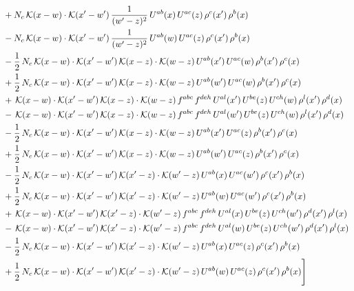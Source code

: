 \documentclass[9pt]{article}
\numberwithin{equation}{section}
\begin{document}
\begin{align}
&+N_{c}\,\mathcal{K}(x-w)\cdot\mathcal{K}(x'-w')\,\frac{1}{(w'-z)^{2}}\,U^{ab}(x)\,U^{ac}(z)\,\rho^{c}(x')\,\rho^{b}(x)\notag\\
&-N_{c}\,\mathcal{K}(x-w)\cdot\mathcal{K}(x'-w')\,\frac{1}{(w'-z)^{2}}\,U^{ab}(w)\,U^{ac}(z)\,\rho^{c}(x')\,\rho^{b}(x)\notag\\
&-\frac{1}{2}\,N_{c}\,\mathcal{K}(x-w)\cdot\mathcal{K}(x'-w')\,\mathcal{K}(x-z)\cdot\mathcal{K}(w-z)\,U^{ab}(x')\,U^{ac}(w)\,\rho^{b}(x')\,\rho^{c}(x)\notag\\
&+\frac{1}{2}\,N_{c}\,\mathcal{K}(x-w)\cdot\mathcal{K}(x'-w')\,\mathcal{K}(x-z)\cdot\mathcal{K}(w-z)\,U^{ab}(w')\,U^{ac}(w)\,\rho^{b}(x')\,\rho^{c}(x)\notag\\
&+\,\mathcal{K}(x-w)\cdot\mathcal{K}(x'-w')\,\mathcal{K}(x-z)\cdot\mathcal{K}(w-z)\,f^{abc}\,f^{deh}\,U^{al}(x')\,U^{be}(z)\,U^{ch}(w)\,\rho^{l}(x')\,\rho^{d}(x)\notag\\
&-\,\mathcal{K}(x-w)\cdot\mathcal{K}(x'-w')\,\mathcal{K}(x-z)\cdot\mathcal{K}(w-z)\,f^{abc}\,f^{deh}\,U^{al}(w')\,U^{be}(z)\,U^{ch}(w)\,\rho^{l}(x')\,\rho^{d}(x)\notag\\
&-\frac{1}{2}\,N_{c}\,\mathcal{K}(x-w)\cdot\mathcal{K}(x'-w')\,\mathcal{K}(x-z)\cdot\mathcal{K}(w-z)\,U^{ab}(x')\,U^{ac}(z)\,\rho^{b}(x')\,\rho^{c}(x)\notag\\
&+\frac{1}{2}\,N_{c}\,\mathcal{K}(x-w)\cdot\mathcal{K}(x'-w')\,\mathcal{K}(x-z)\cdot\mathcal{K}(w-z)\,U^{ab}(w')\,U^{ac}(z)\,\rho^{b}(x')\,\rho^{c}(x)\notag\\
&-\frac{1}{2}\,N_{c}\,\mathcal{K}(x-w)\cdot\mathcal{K}(x'-w')\,\mathcal{K}(x'-z)\cdot\mathcal{K}(w'-z)\,U^{ab}(x)\,U^{ac}(w')\,\rho^{c}(x')\,\rho^{b}(x)\notag\\
&+\frac{1}{2}\,N_{c}\,\mathcal{K}(x-w)\cdot\mathcal{K}(x'-w')\,\mathcal{K}(x'-z)\cdot\mathcal{K}(w'-z)\,U^{ab}(w)\,U^{ac}(w')\,\rho^{c}(x')\,\rho^{b}(x)\notag\\
&+\,\mathcal{K}(x-w)\cdot\mathcal{K}(x'-w')\,\mathcal{K}(x'-z)\cdot\mathcal{K}(w'-z)\,f^{abc}\,f^{deh}\,U^{al}(x)\,U^{be}(z)\,U^{ch}(w')\,\rho^{d}(x')\,\rho^{l}(x)\notag\\
&-\,\mathcal{K}(x-w)\cdot\mathcal{K}(x'-w')\,\mathcal{K}(x'-z)\cdot\mathcal{K}(w'-z)\,f^{abc}\,f^{deh}\,U^{al}(w)\,U^{be}(z)\,U^{ch}(w')\,\rho^{d}(x')\,\rho^{l}(x)\notag\\
&-\frac{1}{2}\,N_{c}\,\mathcal{K}(x-w)\cdot\mathcal{K}(x'-w')\,\mathcal{K}(x'-z)\cdot\mathcal{K}(w'-z)\,U^{ab}(x)\,U^{ac}(z)\,\rho^{c}(x')\,\rho^{b}(x)\notag\\
&+\frac{1}{2}\,N_{c}\,\mathcal{K}(x-w)\cdot\mathcal{K}(x'-w')\,\mathcal{K}(x'-z)\cdot\mathcal{K}(w'-z)\,U^{ab}(w)\,U^{ac}(z)\,\rho^{c}(x')\,\rho^{b}(x)\Bigg]
\end{align}
\end{document}
